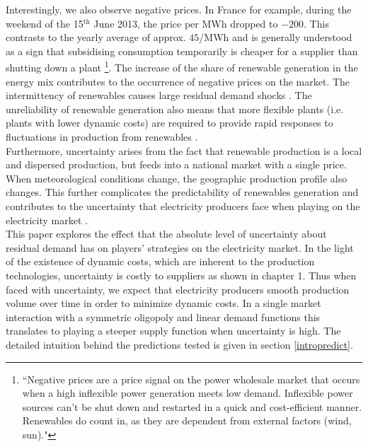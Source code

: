 Interestingly, we also observe negative prices. In France for example, during the weekend of the 15$^\text{th}$ June 2013, the price per MWh dropped to $-200$\EUR{}. This contrasts to the yearly average of approx. $ 45$\EUR{}/MWh and is generally understood as a sign that subsidising consumption temporarily is cheaper for a supplier than shutting down a plant \cite{epexwebsite1}\footnote{``Negative prices are a price signal on the power wholesale market that occurs when a high inflexible power generation meets low demand. Inflexible power sources can’t be shut down and restarted in a quick and cost-efficient manner. Renewables do count in, as they are dependent from external factors (wind, sun)."}.  The increase of the share of renewable generation in the energy mix contributes to the occurrence of negative prices on the market. 
The intermittency of renewables causes large residual demand shocks \cite{epexwebsite1}. The unreliability of renewable generation also means that more flexible plants (i.e. plants with lower dynamic costs) are required to provide rapid responses to fluctuations in production from renewables \cite{ren2013renewables}. \\

Furthermore, uncertainty arises from the fact that renewable production is a local and dispersed production, but feeds into a national market with a single price. When meteorological conditions change, the geographic production profile also changes. This further complicates the predictability of renewables generation and contributes to the uncertainty that electricity producers face when playing %
on the electricity %
market \cite{meibom2009operational}.\\

This paper explores the effect that the absolute level of uncertainty about residual demand has on players' strategies on the electricity market. In the light of the existence of dynamic costs, which are inherent to the production technologies, uncertainty is costly to suppliers as shown in chapter 1. Thus when faced with uncertainty, we expect that electricity producers smooth production volume over time in order to minimize dynamic costs. In a single market interaction with a symmetric oligopoly and linear demand functions this translates to playing a steeper supply function when uncertainty is high. The detailed intuition behind the predictions tested is given in section \ref{intropredict}. 

